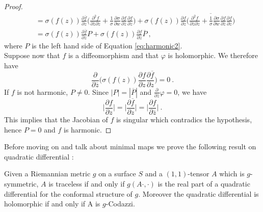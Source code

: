 \begin{proof}
\[\begin{split}
        & = \sigma(f(z)) \frac{\partial \overline{f}}{\partial z} \Big( \frac{\partial^2 f}{\partial \overline{z} \partial z} + \frac{1}{\sigma} \frac{\partial \sigma}{\partial w} \frac{\partial f}{\partial \overline{z}} \frac{\partial f}{ \partial z}  \Big) + 
        \sigma(f(z)) \frac{\partial f}{ \partial z} \overline{ \Big(  \frac{\partial^2 f}{\partial \overline{z} \partial z} + \frac{1}{\sigma} \frac{\partial \sigma}{\partial w} \frac{\partial f}{\partial \overline{z}} \frac{\partial f}{ \partial z}  \Big) }  \\
        & = \sigma(f(z)) \frac{\partial \overline{f}}{\partial z} P + \sigma(f(z)) \frac{\partial f}{ \partial z} \overline{P} \ ,
    \end{split}
    \]
    where $P$ is the left hand side of Equation \ref{eq:harmonic2}.\\
    Suppose now that $f$ is a diffeomorphism and that $\varphi$ is holomorphic. We therefore have
    \[
    \frac{ \partial}{\partial \overline{z}}\Big(\sigma(f(z)) \frac{\partial f}{ \partial z}  \frac{\partial \overline{f}}{\partial z} \Big) = 0 \ .
    \]
    If $f$ is not harmonic, $P\neq 0$.
    Since $|P|=|\overline{P}|$ and $\frac{ \partial}{\partial \overline{z}}\varphi = 0 $, we have
    \[
       \Big| \frac{\partial f}{ \partial z} \Big| = \Big| \frac{\partial \overline{f}}{ \partial z} \Big| = \Big| \frac{\partial f}{ \partial \overline{z}} \Big| \ .
    \]
    This implies that the Jacobian of $f$ is singular which contradics the hypothesis, hence $P=0$ and $f$ is harmonic.
\end{proof}
Before moving on and talk about minimal maps we prove the following result on quadratic differential :
\begin{lemma} \label{lem:HQD}
    Given a Riemannian metric $g$ on a surface $S$ and a $(1,1)$-tensor $A$ which is $g$-symmetric, $A$ is traceless if and only if $g(A \cdot, \cdot)$ is the real part of a quadratic differential for the conformal structure of $g$. Moreover the quadratic differential is holomorphic if and only if A is $g$-Codazzi.
\end{lemma}
